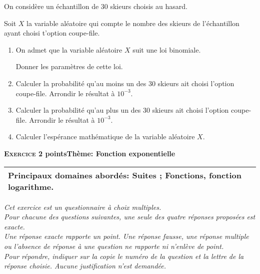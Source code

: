 \documentclass[10pt,a4paper]{article}
\begin{document}
On considère un échantillon de $30$ skieurs choisis au hasard.

Soit $X$ la variable aléatoire qui compte le nombre des skieurs de l'échantillon ayant
choisi t'option coupe-file.

\medskip

\begin{enumerate}
\item On admet que la variable aléatoire $X$ suit une loi binomiale.

Donner les paramètres de cette loi.
\item Calculer la probabilité qu'au moins un des $30$ skieurs ait choisi l'option coupe-file. Arrondir le résultat à $10^{-3}$.
\item Calculer la probabilité qu'au plus un des $30$ skieurs ait choisi l'option coupe-file. Arrondir le résultat à $10^{-3}$.
\item Calculer l'espérance mathématique de la variable aléatoire $X$.
\end{enumerate}

\bigskip

\textbf{\textsc{Exercice 2}  points\hfill Thème: Fonction exponentielle }

\medskip

\begin{tabularx}{\linewidth}{|X|}\hline
\textbf{Principaux domaines abordés:} Suites ; Fonctions, fonction logarithme.\\ \hline
\end{tabularx}

\medskip

\emph{Cet exercice est un questionnaire à choix multiples.\\
Pour chacune des questions suivantes, une seule des quatre réponses proposées
est exacte.\\
Une réponse exacte rapporte un point. Une réponse fausse, une réponse multiple ou
l'absence de réponse à une question ne rapporte ni n'enlève de point.\\
Pour répondre, indiquer sur la copie le numéro de la question et la lettre de la réponse choisie. Aucune justification n'est demandée.}
\end{document}
